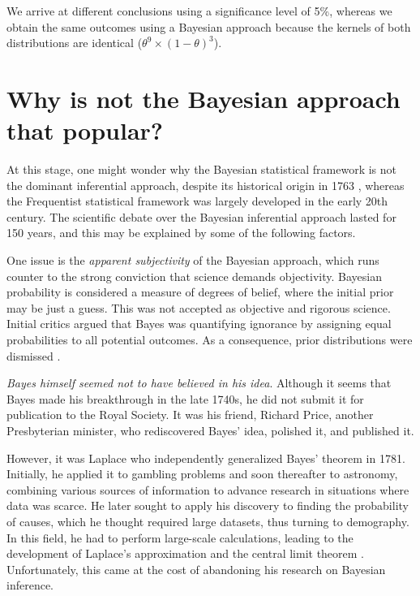 We arrive at different conclusions using a significance level of 5\%, whereas we obtain the same outcomes using a Bayesian approach because the kernels of both distributions are identical ($\theta^9 \times (1 - \theta)^3$).

\section{Why is not the Bayesian approach that popular?}\label{sec25}

At this stage, one might wonder why the Bayesian statistical framework is not the dominant inferential approach, despite its historical origin in 1763 \cite{bayes1763lii}, whereas the Frequentist statistical framework was largely developed in the early 20th century. The scientific debate over the Bayesian inferential approach lasted for 150 years, and this may be explained by some of the following factors.

One issue is the \textit{apparent subjectivity} of the Bayesian approach, which runs counter to the strong conviction that science demands objectivity. Bayesian probability is considered a measure of degrees of belief, where the initial prior may be just a guess. This was not accepted as objective and rigorous science. Initial critics argued that Bayes was quantifying ignorance by assigning equal probabilities to all potential outcomes. As a consequence, prior distributions were dismissed \cite{mcgrayne2011theory}.

\textit{Bayes himself seemed not to have believed in his idea}. Although it seems that Bayes made his breakthrough in the late 1740s, he did not submit it for publication to the Royal Society. It was his friend, Richard Price, another Presbyterian minister, who rediscovered Bayes' idea, polished it, and published it.

However, it was Laplace who independently generalized Bayes' theorem in 1781. Initially, he applied it to gambling problems and soon thereafter to astronomy, combining various sources of information to advance research in situations where data was scarce. He later sought to apply his discovery to finding the probability of causes, which he thought required large datasets, thus turning to demography. In this field, he had to perform large-scale calculations, leading to the development of Laplace’s approximation and the central limit theorem \cite{Laplace1812}. Unfortunately, this came at the cost of abandoning his research on Bayesian inference.

